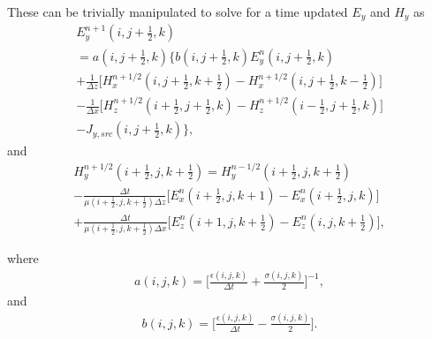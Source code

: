 These can be trivially manipulated to solve for a time updated $E_y$ and $H_y$ as
\begin{multline}
	E_y^{n+1}(i,j+\tfrac{1}{2},k)\\ 
	=a(i,j+\tfrac{1}{2},k) \bigg\{b(i,j+\tfrac{1}{2},k)E_y^{n}(i,j+\tfrac{1}{2},k) \\
	 +\frac{1}{\Delta z}\bigg[H_x^{n+1/2}(i,j+\tfrac{1}{2},k+\tfrac{1}{2})-H_x^{n+1/2}(i,j+\tfrac{1}{2},k-\tfrac{1}{2}) \bigg] \\
	 -\frac{1}{\Delta x} \bigg[H_z^{n+1/2}(i+\tfrac{1}{2},j+\tfrac{1}{2},k)-H_z^{n+1/2}(i-\tfrac{1}{2},j+\tfrac{1}{2},k)\bigg] \\
	 -J_{y,src}(i,j+\tfrac{1}{2},k)
	 \bigg\},
	\label{eq:ey-update}
\end{multline}
and
\begin{multline}
	H_y^{n+1/2}(i+\tfrac{1}{2},j,k+\tfrac{1}{2}) = H_y^{n-1/2}(i+\tfrac{1}{2},j,k+\tfrac{1}{2}) \\ 
	-\frac{\Delta t}{\mu(i+\tfrac{1}{2},j,k+\tfrac{1}{2})\Delta z}\bigg[E_x^n(i+\tfrac{1}{2},j,k+1)-E_x^n(i+\tfrac{1}{2},j,k)\bigg] \\
	+\frac{\Delta t}{\mu(i+\tfrac{1}{2},j,k+\tfrac{1}{2})\Delta x}\bigg[E_z^n(i+1,j,k+\tfrac{1}{2})-E_z^n(i,j,k+\tfrac{1}{2})\bigg],
	\label{eq:hy-update}
\end{multline}

where
\begin{align}
	a(i,j,k) = \bigg[\frac{\epsilon(i,j,k)}{\Delta t}+\frac{\sigma(i,j,k)}{2}\bigg]^{-1},
	\label{eq:a}
\end{align}
and
\begin{align}
	b(i,j,k) = \bigg[\frac{\epsilon(i,j,k)}{\Delta t}-\frac{\sigma(i,j,k)}{2}\bigg].
	\label{eq:a}
\end{align}

